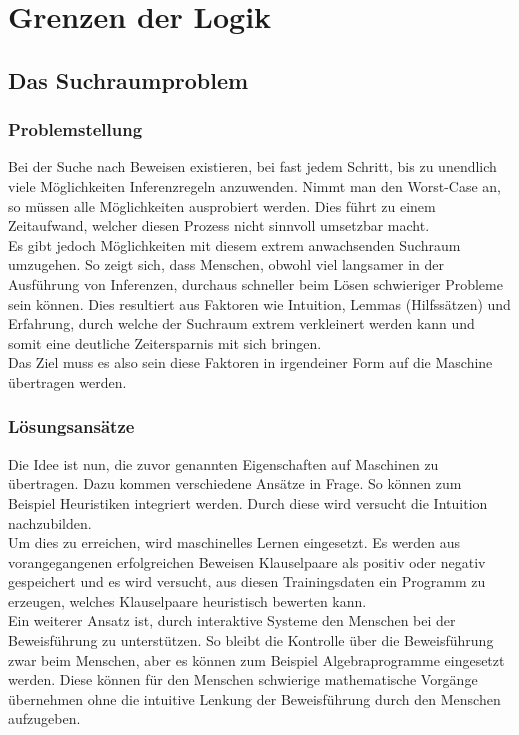 \chapter{Grenzen der Logik}
\label{Grenzen der Logik}



\section{Das Suchraumproblem}
\subsection{Problemstellung}
Bei der Suche nach Beweisen existieren, bei fast jedem Schritt, bis zu unendlich viele Möglichkeiten Inferenzregeln anzuwenden.
Nimmt man den Worst-Case an, so müssen alle Möglichkeiten ausprobiert werden. Dies führt zu einem Zeitaufwand, welcher diesen Prozess nicht sinnvoll umsetzbar macht. \\
Es gibt jedoch Möglichkeiten mit diesem extrem anwachsenden Suchraum umzugehen.
So zeigt sich, dass Menschen, obwohl viel langsamer in der Ausführung von Inferenzen, durchaus schneller beim Lösen schwieriger Probleme sein können.
Dies resultiert aus Faktoren wie Intuition, Lemmas (Hilfssätzen) und Erfahrung, durch welche der Suchraum extrem verkleinert werden kann und somit eine deutliche Zeitersparnis mit sich bringen.\\
Das Ziel muss es also sein diese Faktoren in irgendeiner Form auf die Maschine übertragen werden.

\subsection{Lösungsansätze} 
Die Idee ist nun, die zuvor genannten Eigenschaften auf Maschinen zu übertragen.
Dazu kommen verschiedene Ansätze in Frage. So können zum Beispiel Heuristiken integriert werden. Durch diese wird versucht die Intuition nachzubilden.\\
Um dies zu erreichen, wird maschinelles Lernen eingesetzt. Es werden aus vorangegangenen erfolgreichen Beweisen Klauselpaare als positiv oder negativ gespeichert und es wird versucht, aus diesen Trainingsdaten ein Programm zu erzeugen, welches Klauselpaare heuristisch bewerten kann.\\
Ein weiterer Ansatz ist, durch interaktive Systeme den Menschen bei der Beweisführung zu unterstützen. So bleibt die Kontrolle über die Beweisführung zwar beim Menschen, aber es können zum Beispiel Algebraprogramme eingesetzt werden. Diese können für den Menschen schwierige mathematische Vorgänge übernehmen ohne die intuitive Lenkung der Beweisführung durch den Menschen aufzugeben.

